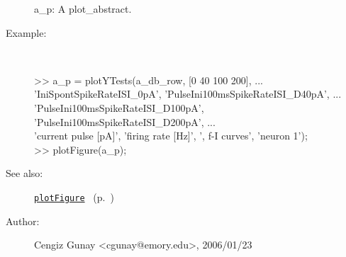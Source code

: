 \begin{description}
	a\_p: A plot\_abstract.
%
\item[Example:]~
\begin{lyxcode} >> a\_p = plotYTests(a\_db\_row, [0 40 100 200], ...\\%
                      {'IniSpontSpikeRateISI\_0pA', 'PulseIni100msSpikeRateISI\_D40pA', ...\\%
                       'PulseIni100msSpikeRateISI\_D100pA', 'PulseIni100msSpikeRateISI\_D200pA'}, ...\\%
                      {'current pulse [pA]', 'firing rate [Hz]'}, ', f-I curves', 'neuron 1');\\%
 >> plotFigure(a\_p);\\%
\end{lyxcode}
%
\item[See also:]%
\hyperlink{ref_plotFigure}{\texttt{plotFigure}}%
\ (p.~\pageref{ref_plotFigure})%
%
%
\item[Author:]%
Cengiz Gunay <cgunay@emory.edu>, 2006/01/23%
\end{description}
\methodline%
